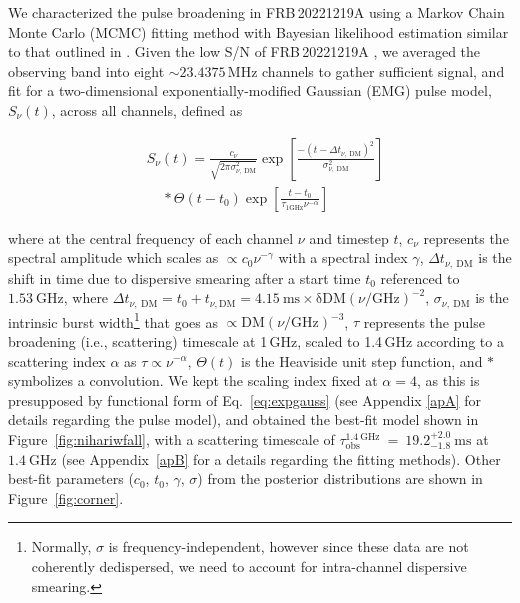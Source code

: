 \documentclass[twocolumn, linenumbers, tra]{aastex631}
\newcommand{\nihari}{FRB\,20221219A } %
\begin{document}
{
We characterized the pulse broadening in \nihari using a Markov Chain Monte Carlo (MCMC) fitting method with Bayesian likelihood estimation similar to that outlined in \cite{Ravi2019}. Given the low S/N of \nihari, we averaged the observing band into eight $ \sim 23.4375$\,MHz channels to gather sufficient signal, and fit for a two-dimensional exponentially-modified Gaussian (EMG) pulse model, $S_{\nu}(t)$, across all channels, defined as 

\begin{equation}\label{eq:expgauss}
\begin{aligned}
& S_{\nu}(t)=\frac{c_{\nu}}{\sqrt{2 \pi \sigma_{\nu,\ \mathrm{DM}}^2}} \exp \left[\frac{-\left(t-\Delta t_{\nu,\ \mathrm{DM}} \right)^2}{\sigma_{\nu,\ \mathrm{DM}}^2}\right] \\
&~~~~~ \ast \Theta\left(t-t_0\right) \exp \left[\frac{t-t_0}{\tau_{1\mathrm{GHz}} \nu^{-\alpha}}\right]
\end{aligned}
\end{equation}

\noindent
where at the central frequency of each channel $\nu$ and timestep $t$, $c_{\nu}$ represents the spectral amplitude which scales as $\propto c_0\nu^{-\gamma}$ with a spectral index $\gamma$, $\Delta t_{\nu,\ \mathrm{DM}}$ is the shift in time due to dispersive smearing after a start time $t_0$ referenced to $1.53\ \mathrm{GHz}$, where $\Delta t_{\nu,\ \mathrm{DM}} = t_0 + t_{\nu, \mathrm{DM}}=4.15 \mathrm{~ms} \times \mathrm{\delta DM}\left(\nu / \mathrm{GHz}\right)^{-2}$, $\sigma_{\nu,\ \mathrm{DM}}$ is the intrinsic burst width\footnote{{Normally, $\sigma$ is frequency-independent, however since these data are not coherently dedispersed, we need to account for intra-channel dispersive smearing.}} that goes as $\propto \mathrm{DM}\left(\nu / \mathrm{GHz}\right)^{-3}$, $\tau$ represents the pulse broadening (i.e., scattering) timescale at 1\,GHz, scaled to 1.4\,GHz according to a scattering index $\alpha$ as $\tau \propto \nu^{-\alpha}$, $\Theta(t)$ is the Heaviside unit step function, and $\ast$ symbolizes a convolution. We kept the scaling index fixed at $\alpha = 4$, as this is presupposed by functional form of Eq.~\ref{eq:expgauss} (see Appendix \ref{apA} for details regarding the pulse model), and obtained the best-fit model shown in Figure\ \ref{fig:nihariwfall}, with a scattering timescale of $\tau^{\mathrm{1.4\ GHz}}_{\mathrm{obs}}\ =\ 19.2_{-1.8}^{+2.0}\ \mathrm{ms}$ at $1.4\ \mathrm{GHz}$ (see Appendix\ \ref{apB} for a details regarding the fitting methods). Other best-fit parameters ($c_0$, $t_0$, $\gamma$, $\sigma$) from the posterior distributions are shown in Figure\ \ref{fig:corner}.}
\end{document}
